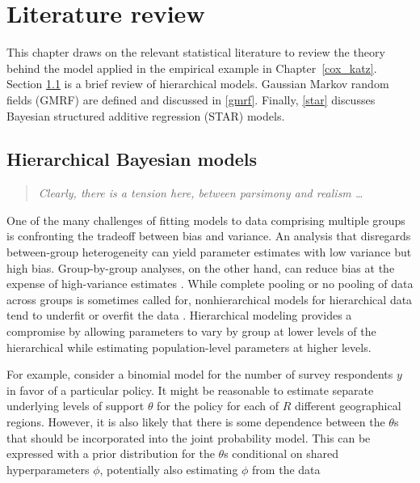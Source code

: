 
\chapter{Literature review}
\label{lit_review}

This chapter draws on the relevant statistical literature to review the theory behind the model applied in the empirical example in Chapter~\ref{cox_katz}. Section \ref{hierarchical} is a brief review of hierarchical models. Gaussian Markov random fields (GMRF) are defined and discussed in \ref{gmrf}. Finally, \ref{star} discusses Bayesian structured additive regression (STAR) models. 

\section{Hierarchical Bayesian models}
\label{hierarchical}

\begin{quote}
{\it Clearly, there is a tension here, between parsimony and realism \dots }

\hfill {}    
\end{quote}

One of the many challenges of fitting models to data comprising multiple groups is confronting the tradeoff between bias and variance. An analysis that disregards between-group heterogeneity can yield parameter estimates with low variance but high bias. Group-by-group analyses, on the other hand, can reduce bias at the expense of high-variance estimates . While complete pooling or no pooling of data across groups is sometimes called for, nonhierarchical models for hierarchical data tend to underfit or overfit the data . Hierarchical modeling provides a compromise by allowing parameters to vary by group at lower levels of the hierarchical while estimating population-level parameters at higher levels. 

For example, consider a binomial model for the number of survey respondents $y$ in favor of a particular policy. It might be reasonable to estimate separate underlying levels of support $\theta$ for the policy for each of $R$ different geographical regions. However, it is also likely that there is some dependence between the $\theta$s that should be incorporated into the joint probability model. This can be expressed with a prior distribution for the $\theta$s conditional on shared hyperparameters $\phi$, potentially also estimating $\phi$ from the data 

